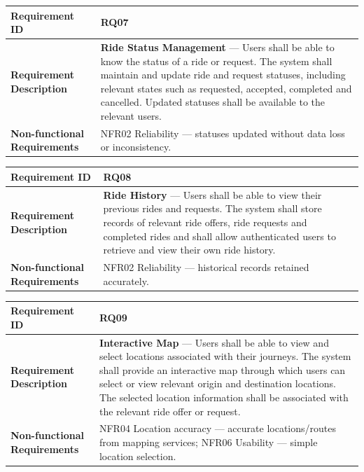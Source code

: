 \begin{minipage}{\textwidth}
\small
\begin{tabular}{|>{\raggedright\arraybackslash}p{}|>{\raggedright\arraybackslash}p{}|}
\hline
\textbf{Requirement ID} & RQ07 \\
\hline
\textbf{Requirement Description} & \textbf{Ride Status Management} --- Users shall be able to know the status of a ride or request. The system shall maintain and update ride and request statuses, including relevant states such as requested, accepted, completed and cancelled. Updated statuses shall be available to the relevant users. \\
\hline
\textbf{Non-functional Requirements} & NFR02 Reliability --- statuses updated without data loss or inconsistency. \\
\hline
\end{tabular}
\end{minipage}
\medskip
 
\begin{minipage}{\textwidth}
\small
\begin{tabular}{|>{\raggedright\arraybackslash}p{}|>{\raggedright\arraybackslash}p{}|}
\hline
\textbf{Requirement ID} & RQ08 \\
\hline
\textbf{Requirement Description} & \textbf{Ride History} --- Users shall be able to view their previous rides and requests. The system shall store records of relevant ride offers, ride requests and completed rides and shall allow authenticated users to retrieve and view their own ride history. \\
\hline
\textbf{Non-functional Requirements} & NFR02 Reliability --- historical records retained accurately. \\
\hline
\end{tabular}
\end{minipage}
\medskip
 
\begin{minipage}{\textwidth}
\small
\begin{tabular}{|>{\raggedright\arraybackslash}p{}|>{\raggedright\arraybackslash}p{}|}
\hline
\textbf{Requirement ID} & RQ09 \\
\hline
\textbf{Requirement Description} & \textbf{Interactive Map} --- Users shall be able to view and select locations associated with their journeys. The system shall provide an interactive map through which users can select or view relevant origin and destination locations. The selected location information shall be associated with the relevant ride offer or request. \\
\hline
\textbf{Non-functional Requirements} & NFR04 Location accuracy --- accurate locations/routes from mapping services; \newline NFR06 Usability --- simple location selection. \\
\hline
\end{tabular}
\end{minipage}
\medskip
 

